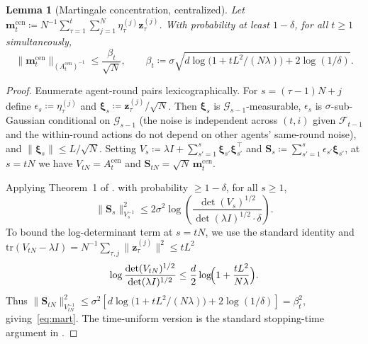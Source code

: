 \documentclass[11pt]{article}
\newtheorem{lemma}[theorem]{Lemma}
\begin{document}
\begin{lemma}[Martingale concentration, centralized]\label{lem:mart}
Let $\bm{m}_t^{\mathrm{cen}}\coloneqq
N^{-1}\sum_{\tau=1}^t\sum_{j=1}^N\eta_\tau^{(j)}\bm{z}_\tau^{(j)}$.
With probability at least $1-\delta$, for all $t\geq 1$
simultaneously,
\begin{equation}
\|\bm{m}_t^{\mathrm{cen}}\|_{(A_t^{\mathrm{cen}})^{-1}}
\leq\frac{\beta_t}{\sqrt{N}},
\qquad
\beta_t\coloneqq\sigma\sqrt{d\log\!\bigl(1+tL^2/(N\lambda)\bigr)+2\log(1/\delta)}.
\label{eq:mart}
\end{equation}
\end{lemma}

\begin{proof}
Enumerate agent-round pairs lexicographically. For $s=(\tau-1)N+j$ define
$\epsilon_s\coloneqq\eta_\tau^{(j)}$
and $\bm{\xi}_s\coloneqq\bm{z}_\tau^{(j)}/\sqrt{N}$.
Then $\bm{\xi}_s$ is $\mathcal{G}_{s-1}$-measurable,
$\epsilon_s$ is $\sigma$-sub-Gaussian conditional on $\mathcal{G}_{s-1}$
(the noise is independent across $(t,i)$ given $\mathcal{F}_{t-1}$ and
the within-round actions do not depend on other agents' same-round
noise), and $\|\bm{\xi}_s\|\leq L/\sqrt{N}$.
Setting $V_s\coloneqq\lambda I+\sum_{s'=1}^s\bm{\xi}_{s'}\bm{\xi}_{s'}^\top$
and $\bm{S}_s\coloneqq\sum_{s'=1}^s\epsilon_{s'}\bm{\xi}_{s'}$,
at $s=tN$ we have $V_{tN}=A_t^{\mathrm{cen}}$ and
$\bm{S}_{tN}=\sqrt{N}\,\bm{m}_t^{\mathrm{cen}}$.

Applying Theorem~1 of \citet{abbasi2011}.
with probability $\geq 1-\delta$, for all $s\geq 1$,
\[
\|\bm{S}_s\|_{V_s^{-1}}^2
\leq 2\sigma^2\log\!\left(\frac{\det(V_s)^{1/2}}
{\det(\lambda I)^{1/2}\cdot\delta}\right).
\]
To bound the log-determinant term at $s=tN$, we use the standard
identity \citep[Lemma~10]{abbasi2011} and
$\mathrm{tr}(V_{tN}-\lambda I)=N^{-1}\sum_{\tau,j}\|\bm{z}_\tau^{(j)}\|^2\leq tL^2$ \[
\log\frac{\det(V_{tN})^{1/2}}{\det(\lambda I)^{1/2}}
\leq\frac{d}{2}\log\!\Bigl(1+\frac{tL^2}{N\lambda}\Bigr).
\]
Thus $\|\bm{S}_{tN}\|_{V_{tN}^{-1}}^2\leq
\sigma^2\!\left[d\log\!\bigl(1+tL^2/(N\lambda)\bigr)+2\log(1/\delta)\right]
=\beta_t^2$,
giving~\eqref{eq:mart}. The time-uniform version is the standard
stopping-time argument in \citet{abbasi2011}.
\end{proof}
\end{document}
